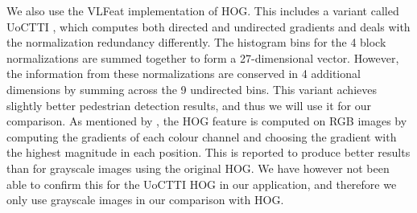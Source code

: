\documentclass[thesis.tex]{subfiles}
\begin{document}
We also use the VLFeat implementation of HOG. This includes a variant called UoCTTI \cite{felzenszwalb2009object}, which computes both directed and undirected gradients and deals with the normalization redundancy differently. The histogram bins for the 4 block normalizations are summed together to form a 27-dimensional vector. However, the information from these normalizations are conserved in 4 additional dimensions by summing across the 9 undirected bins. This variant achieves slightly better pedestrian detection results, and thus we will use it for our comparison. As mentioned by \citet{dalal2005histograms}, the HOG feature is computed on RGB images by computing the gradients of each colour channel and choosing the gradient with the highest magnitude in each position. This is reported to produce better results than for grayscale images using the original HOG. We have however not been able to confirm this for the UoCTTI HOG in our application, and therefore we only use grayscale images in our comparison with HOG.
%
%
\end{document}
